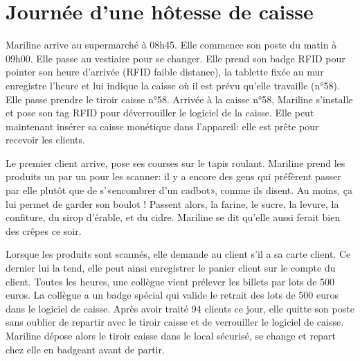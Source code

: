 \section{Journée d'une hôtesse de caisse}

Mariline arrive au supermarché à 08h45. 
Elle commence son poste du matin à 09h00. 
Elle passe au vestiaire pour se changer. 
Elle prend son badge RFID pour pointer son heure d'arrivée (RFID faible distance), la tablette fixée au mur enregistre l'heure et lui indique la caisse où il est prévu qu'elle travaille (n°58).
Elle passe prendre le tiroir caisse n°58.
Arrivée à la caisse n°58, Mariline s'installe et pose son tag RFID pour déverrouiller le logiciel de la caisse. 
Elle peut maintenant insérer sa caisse monétique dans l'appareil: elle est prête pour recevoir les clients. 
\par
Le premier client arrive, pose ses courses sur le tapis roulant. 
Mariline prend les produits un par un pour les scanner: il y a encore des gens qui préfèrent passer par elle plutôt que de s'«encombrer d'un cadbot», comme ils disent.
Au moins, ça lui permet de garder son boulot !
Passent alors, la farine, le sucre, la levure, la confiture, du sirop d'érable, et du cidre. 
Mariline se dit qu'elle aussi ferait bien des crêpes ce soir. 
\par
Lorsque les produits sont scannés, elle demande au client s'il a sa carte client. 
Ce dernier lui la tend, elle peut ainsi enregistrer le panier client sur le compte du client.
Toutes les heures, une collègue vient prélever les billets par lots de 500 euros. 
La collègue a un badge spécial qui valide le retrait des lots de 500 euros dans le logiciel de caisse. 
Après avoir traité 94 clients ce jour, elle quitte son poste sans oublier de repartir avec le tiroir caisse et de verrouiller le logiciel de caisse. 
Mariline dépose alors le tiroir caisse dans le local sécurisé, se change et repart chez elle en badgeant avant de partir.
